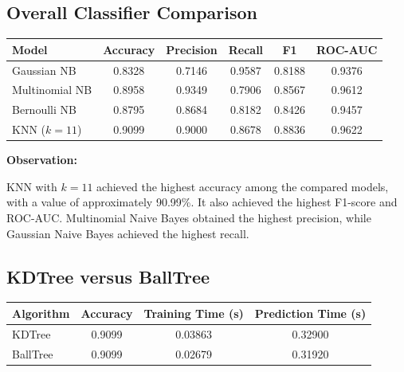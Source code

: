 \documentclass[12pt,a4paper]{article}
\begin{document}

\subsection{Overall Classifier Comparison}

\begin{longtable}{|p{4cm}|c|c|c|c|c|}
\hline
\textbf{Model} &
\textbf{Accuracy} &
\textbf{Precision} &
\textbf{Recall} &
\textbf{F1} &
\textbf{ROC-AUC} \\ \hline

Gaussian NB &
0.8328 &
0.7146 &
0.9587 &
0.8188 &
0.9376 \\ \hline

Multinomial NB &
0.8958 &
0.9349 &
0.7906 &
0.8567 &
0.9612 \\ \hline

Bernoulli NB &
0.8795 &
0.8684 &
0.8182 &
0.8426 &
0.9457 \\ \hline

KNN ($k=11$) &
0.9099 &
0.9000 &
0.8678 &
0.8836 &
0.9622 \\ \hline

\end{longtable}

\textbf{Observation:}

KNN with $k=11$ achieved the highest accuracy among the compared models, with a value of approximately 90.99\%. It also achieved the highest F1-score and ROC-AUC. Multinomial Naive Bayes obtained the highest precision, while Gaussian Naive Bayes achieved the highest recall.


\subsection{KDTree versus BallTree}

\begin{longtable}{|p{3.5cm}|c|c|c|}
\hline
\textbf{Algorithm} &
\textbf{Accuracy} &
\textbf{Training Time (s)} &
\textbf{Prediction Time (s)} \\ \hline

KDTree &
0.9099 &
0.03863 &
0.32900 \\ \hline

BallTree &
0.9099 &
0.02679 &
0.31920 \\ \hline

\end{longtable}
\end{document}

